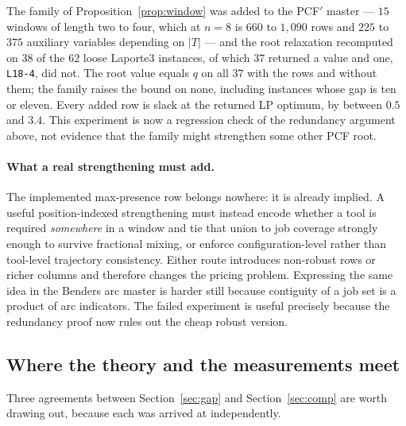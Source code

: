\begin{observation}\label{obs:windowroot}
The family of Proposition~\ref{prop:window} was added to the PCF$'$ master --- $15$
windows of length two to four, which at $n=8$ is $660$ to $1{,}090$ rows and $225$ to
$375$ auxiliary variables depending on $\lvert T\rvert$ ---
and the root relaxation recomputed on $38$ of the $62$ loose Laporte3 instances, of
which $37$ returned a value and one, \texttt{L18-4}, did not. The root
value equals $q$ on all $37$ with the rows and without them; the family raises the bound
on none, including instances whose gap is ten or eleven. Every added row is slack at the
returned LP optimum, by between $0.5$ and $3.4$. This experiment is now a regression
check of the redundancy argument above, not evidence that the family might strengthen
some other PCF root.
\end{observation}

\paragraph{What a real strengthening must add.}
The implemented max-presence row belongs nowhere: it is already implied. A useful
position-indexed strengthening must instead encode whether a tool is required
\emph{somewhere} in a window and tie that union to job coverage strongly enough to
survive fractional mixing, or enforce configuration-level rather than tool-level
trajectory consistency. Either route introduces non-robust rows or richer columns and
therefore changes the pricing problem. Expressing the same idea in the Benders
arc master is harder still because contiguity of a job set is a product of arc
indicators. The failed experiment is useful precisely because the redundancy proof
now rules out the cheap robust version.

\subsection{Where the theory and the measurements meet}\label{ssec:disc-agree}

Three agreements between Section~\ref{sec:gap} and Section~\ref{sec:comp} are worth
drawing out, because each was arrived at independently.

